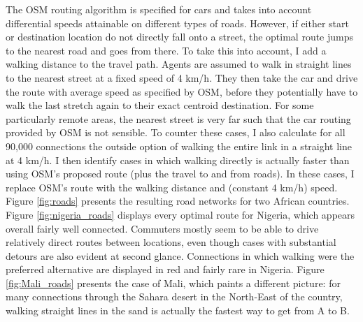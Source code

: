 \documentclass[11pt, oneside]{article}   	%
\begin{document}
The OSM routing algorithm is specified for cars and takes into account differential speeds attainable on different types of roads. However, if either start or destination location do not directly fall onto a street, the optimal route jumps to the nearest road and goes from there. To take this into account, I add a walking distance to the travel path. Agents are assumed to walk in straight lines to the nearest street at a fixed speed of 4 km/h. They then take the car and drive the route with average speed as specified by OSM, before they potentially have to walk the last stretch again to their exact centroid destination. For some particularly remote areas, the nearest street is very far such that the car routing provided by OSM is not sensible. To counter these cases, I also calculate for all 90,000 connections the outside option of walking the entire link in a straight line at 4 km/h. I then identify cases in which walking directly is actually faster than using OSM's proposed route (plus the travel to and from roads). In these cases, I replace OSM's route with the walking distance and (constant 4 km/h) speed. Figure \ref{fig:roads} presents the resulting road networks for two African countries. Figure \ref{fig:nigeria_roads} displays every optimal route for Nigeria, which appears overall fairly well connected. Commuters mostly seem to be able to drive relatively direct routes between locations, even though cases with substantial detours are also evident at second glance. Connections in which walking were the preferred alternative are displayed in red and fairly rare in Nigeria. Figure \ref{fig:Mali_roads} presents the case of Mali, which paints a different picture: for many connections through the Sahara desert in the North-East of the country, walking straight lines in the sand is actually the fastest way to get from A to B.

\end{document}
